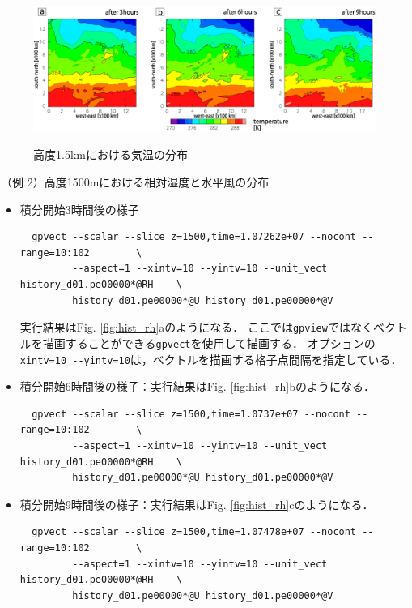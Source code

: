 \begin{figure}[t]
\begin{center}
  \includegraphics[width=0.9\hsize]{./figure/gpview_hist_t.eps}\\
  \caption{高度1.5kmにおける気温の分布}
  \label{fig:hist_t}
\end{center}
\end{figure}


（例 2）高度1500mにおける相対湿度と水平風の分布
\begin{itemize}

\item 積分開始3時間後の様子
  \begin{verbatim}
  gpvect --scalar --slice z=1500,time=1.07262e+07 --nocont --range=10:102        \
         --aspect=1 --xintv=10 --yintv=10 --unit_vect history_d01.pe00000*@RH    \
         history_d01.pe00000*@U history_d01.pe00000*@V
  \end{verbatim}
  実行結果はFig. \ref{fig:hist_rh}aのようになる．
  ここでは\verb|gpview|ではなくベクトルを描画することができる\verb|gpvect|を使用して描画する．
  オプションの\verb|--xintv=10 --yintv=10|は，ベクトルを描画する格子点間隔を指定している．

\item 積分開始6時間後の様子：実行結果はFig. \ref{fig:hist_rh}bのようになる．
  \begin{verbatim}
  gpvect --scalar --slice z=1500,time=1.0737e+07 --nocont --range=10:102        \
         --aspect=1 --xintv=10 --yintv=10 --unit_vect history_d01.pe00000*@RH    \
         history_d01.pe00000*@U history_d01.pe00000*@V
  \end{verbatim}

\item 積分開始9時間後の様子：実行結果はFig. \ref{fig:hist_rh}cのようになる．
  \begin{verbatim}
  gpvect --scalar --slice z=1500,time=1.07478e+07 --nocont --range=10:102        \
         --aspect=1 --xintv=10 --yintv=10 --unit_vect history_d01.pe00000*@RH    \
         history_d01.pe00000*@U history_d01.pe00000*@V
  \end{verbatim}
\end{itemize}


